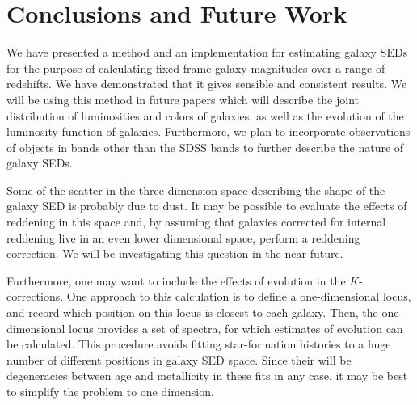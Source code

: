 \documentclass[10pt,preprint]{aastex}
\begin{document}
\section{Conclusions and Future Work}
\label{conclusions}

We have presented a method and an implementation for estimating galaxy
SEDs for the purpose of calculating fixed-frame galaxy magnitudes over
a range of redshifts. We have demonstrated that it gives sensible and
consistent results. We will be using this method in future papers
which will describe the joint distribution of luminosities and colors
of galaxies, as well as the evolution of the luminosity function of
galaxies. Furthermore, we plan to incorporate observations of objects
in bands other than the SDSS bands to further describe the nature of
galaxy SEDs.

Some of the scatter in the three-dimension space describing the shape
of the galaxy SED is probably due to dust. It may be possible to
evaluate the effects of reddening in this space and, by assuming that
galaxies corrected for internal reddening live in an even lower
dimensional space, perform a reddening correction. We will be
investigating this question in the near future.

Furthermore, one may want to include the effects of evolution in the
$K$-corrections. One approach to this calculation is to define a
one-dimensional locus, and record which position on this locus is
closest to each galaxy. Then, the one-dimensional locus provides a set
of spectra, for which estimates of evolution can be calculated. This
procedure avoids fitting star-formation histories to a huge number of
different positions in galaxy SED space. Since their will be
degeneracies between age and metallicity in these fits in any case, it
may be best to simplify the problem to one dimension.
\end{document}
